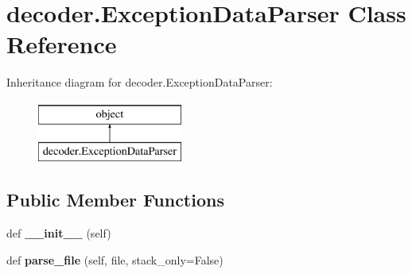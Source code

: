 \hypertarget{classdecoder_1_1_exception_data_parser}{}\section{decoder.\+Exception\+Data\+Parser Class Reference}
\label{classdecoder_1_1_exception_data_parser}
Inheritance diagram for decoder.\+Exception\+Data\+Parser\+:\begin{figure}[H]
\begin{center}
\leavevmode
\includegraphics[height=2.000000cm]{classdecoder_1_1_exception_data_parser}
\end{center}
\end{figure}
\subsection*{Public Member Functions}
\begin{DoxyCompactItemize}
\item 
\mbox{\label{classdecoder_1_1_exception_data_parser_a98db8cfa16befbb68e8a7df301bfe813}} 
def {\bfseries \+\_\+\+\_\+init\+\_\+\+\_\+} (self)
\item 
\mbox{\label{classdecoder_1_1_exception_data_parser_ac98fb414183ed2c761e408d203a6f587}} 
def {\bfseries parse\+\_\+file} (self, file, stack\+\_\+only=False)
\end{DoxyCompactItemize}
